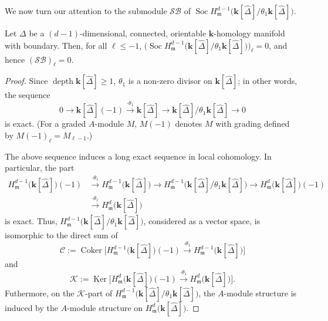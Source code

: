 \documentclass[ALCO,ThmDefs,Unicode,epreuves]{cedram}
\DeclareMathOperator{\Soc}{Soc}
\DeclareMathOperator\depth{depth}
\DeclareMathOperator\Ker{Ker}
\DeclareMathOperator\Coker{Coker}
\newcommand{\complet}[1]{\hat{#1}}
\newcommand{\SB}{\mathcal{SB}}
\newcommand{\field}{\mathbf{k}}
\renewcommand{\C}{{\mathcal C}}
\newcommand{\K}{{\mathcal K}}
\newcommand{\mideal}{\ensuremath{\mathfrak{m}}}
\begin{document}
We now turn our attention to the submodule $\SB$ of $\Soc H^{d-1}_\mideal\big(\field[\complet{\Delta}]/\theta_1\field[\complet{\Delta}]\big)$.
\begin{prop} \label{SB}
Let $\Delta$ be a $(d-1)$-dimensional, connected, orientable $\field$-homology manifold with boundary. Then, for all $\ell\leq -1$, $\big(\Soc H^{d-1}_\mideal\big(\field[\complet{\Delta}]/\theta_1\field[\complet{\Delta}]\big)\big)_\ell=0$, and hence $(\SB)_\ell=0$.
\end{prop}
\begin{proof}
Since $\depth \field[\complet{\Delta}]\geq 1$, $\theta_1$ is a non-zero divisor on $\field[\complet{\Delta}]$; in other words, the sequence
\[
0\to \field[\complet{\Delta}](-1) \stackrel{\cdot \theta_1}{\longrightarrow} \field[\complet{\Delta}] \longrightarrow \field[\complet{\Delta}]/\theta_1\field[\complet{\Delta}]\to 0
\]
is exact. (For a graded $A$-module $M$, $M(-1)$ denotes $M$ with grading defined by $M(-1)_\ell=M_{\ell-1}$.) 

The above sequence induces a long exact sequence in local cohomology. In particular, the part
\[
\begin{aligned}
H^{d-1}_\mideal\big(\field[\complet{\Delta}]\big)(-1) &\stackrel{\cdot \theta_1}{\longrightarrow} H^{d-1}_\mideal\big(\field[\complet{\Delta}]\big) \longrightarrow H^{d-1}_\mideal\big(\field[\complet{\Delta}]/\theta_1\field[\complet{\Delta}]\big)\longrightarrow H^{d}_\mideal\big(\field[\complet{\Delta}]\big)(-1) 
\\
&\stackrel{\cdot \theta_1}{\longrightarrow} H^{d}_\mideal\big(\field[\complet{\Delta}]\big)
\end{aligned}
\]
is exact. Thus, $H^{d-1}_\mideal\big(\field[\complet{\Delta}]/\theta_1\field[\complet{\Delta}]\big)$, considered as a vector space, is isomorphic to the direct sum of 
\[
\C:=\Coker \big[H^{d-1}_\mideal\big(\field[\complet{\Delta}]\big)(-1) \stackrel{\cdot \theta_1}{\longrightarrow} H^{d-1}_\mideal\big(\field[\complet{\Delta}]\big)\big]\] 
and 
\[\K:=\Ker \big[H^{d}_\mideal\big(\field[\complet{\Delta}]\big)(-1) \stackrel{\cdot \theta_1}{\longrightarrow} H^{d}_\mideal\big(\field[\complet{\Delta}]\big)\big].
\]
 Futhermore, on the $\K$-part of $H^{d-1}_\mideal\big(\field[\complet{\Delta}]/\theta_1\field[\complet{\Delta}]\big)$, the $A$-module structure is induced by the $A$-module structure on $H^{d}_\mideal\big(\field[\complet{\Delta}]\big)$.


\end{proof}
\end{document}
